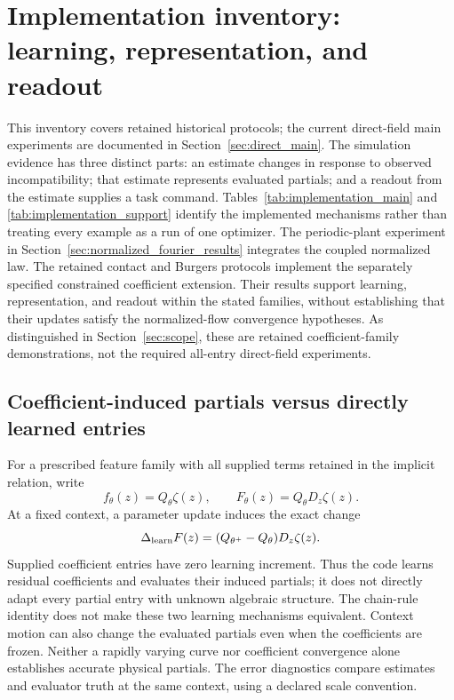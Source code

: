 \section{Implementation inventory: learning, representation, and readout}
\label{sec:implementation_inventory}
This inventory covers retained historical protocols; the current direct-field
main experiments are documented in Section~\ref{sec:direct_main}.
The simulation evidence has three distinct parts: an estimate changes in
response to observed incompatibility; that estimate represents evaluated
partials; and a readout from the estimate supplies a task command.
Tables~\ref{tab:implementation_main} and
\ref{tab:implementation_support} identify the implemented mechanisms rather
than treating every example as a run of one optimizer. The periodic-plant
experiment in Section~\ref{sec:normalized_fourier_results} integrates the
coupled normalized law. The retained contact and Burgers protocols implement the separately
specified constrained coefficient extension. Their results support learning,
representation, and readout within the stated families, without establishing
that their updates satisfy the normalized-flow convergence hypotheses.
As distinguished in Section~\ref{sec:scope}, these are retained
coefficient-family demonstrations, not the required all-entry direct-field
experiments.

\subsection{Coefficient-induced partials versus directly learned entries}
For a prescribed feature family with all supplied terms retained in the
implicit relation, write
\begin{equation}
 f_\theta(z)=Q_\theta\zeta(z),\qquad
 F_\theta(z)=Q_\theta D_z\zeta(z).
 \label{eq:inventory_representation}
\end{equation}
At a fixed context, a parameter update induces the exact change
\begin{equation}
 \Delta_{\rm learn}F(z)
 =(Q_{\theta^+}-Q_\theta)D_z\zeta(z).
 \label{eq:inventory_partial_update}
\end{equation}
Supplied coefficient entries have zero learning increment. Thus the code
learns residual coefficients and evaluates their induced partials; it does
not directly adapt every partial entry with unknown algebraic structure.
The chain-rule identity does not make these two learning mechanisms
equivalent. Context motion
can also change the evaluated partials even when the coefficients are frozen.
Neither a rapidly varying curve nor coefficient convergence alone establishes
accurate physical partials. The error diagnostics compare estimates and
evaluator truth at the same context, using a declared scale convention.

